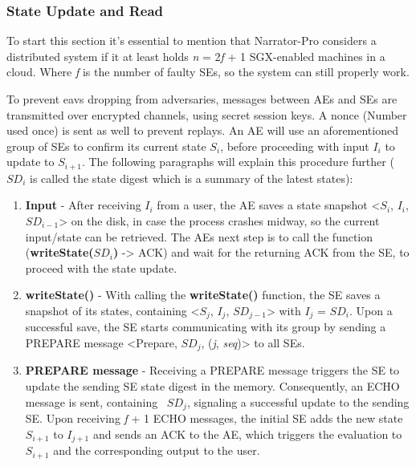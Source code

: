 \subsubsection{State Update and Read}


To start this section it's essential to mention that Narrator-Pro considers a distributed system if it at least holds \textit{n} = 2\textit{f} + 1 SGX-enabled machines in a cloud. Where \textit{f} is the number of faulty SEs, so the system can still properly work.

To prevent eavs dropping from adversaries, messages between AEs and SEs are transmitted over encrypted channels, using secret session keys. A nonce (Number used once) is sent as well to prevent replays. An AE will use an aforementioned group of SEs to confirm its current state \(S_i\), before proceeding with input \(I_i\) to update to \(S_{i+1}\). The following paragraphs will explain this procedure further (\(SD_{i}\) is called the state digest which is a summary of the latest states):

\begin{enumerate}
    \item \textbf{Input} - After receiving \(I_i\) from a user, the AE saves a state snapshot <\(S_i\), \(I_i\), \(SD_{i-1}\)> on the disk, in case the process crashes midway, so the current input/state can be retrieved. The AEs next step is to call the function (\textbf{writeState(\(SD_i\))} -> ACK) and wait for the returning ACK from the SE, to proceed with the state update.
    \item \textbf{writeState()} - With calling the \textbf{writeState()} function, the SE saves a snapshot of its states, containing <\(S_j\), \(I_j\), \(SD_{j-1}\)> with \(I_j\) = \(SD_{i}\). Upon a successful save, the SE starts communicating with its group by sending a PREPARE message <Prepare, \(SD_{j}\), (\textit{j}, \textit{seq})> to all SEs.
    \item \textbf{PREPARE message} - Receiving a PREPARE message triggers the SE to update the sending SE state digest in the memory. Consequently, an ECHO message is sent, containing  \(SD_{j}\), signaling a successful update to the sending SE. Upon receiving \textit{f} + 1 ECHO messages, the initial SE adds the new state \(S_{i+1}\) to \(I_{j+1}\) and sends an ACK to the AE, which triggers the evaluation to \(S_{i+1}\) and the corresponding output to the user.
\end{enumerate}

